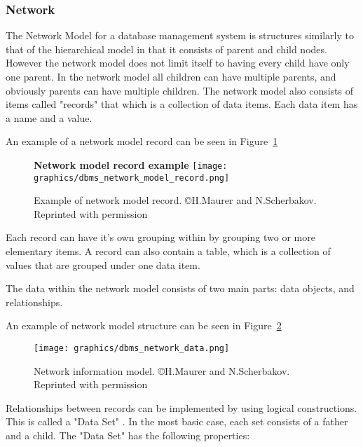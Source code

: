\documentclass[letterpaper, 12pt]{article}
\begin{document}
\subsubsection{Network}
The Network Model for a database management system is structures similarly to that of the
hierarchical model in that it consists of parent and child nodes. However the network
model does not limit itself to having every child have only one parent. In the network
model all children can have multiple parents, and obviously parents can have multiple
children. The network model also consists of items called "records" that which is a
collection of data items. Each data item has a name and a value.
\par\vspace{\baselineskip}
An example of a network model record can be seen in Figure~\ref{fig:networkDBMS_record}
\begin{figure}
  \centering
  \label{fig:networkDBMS_record}
  \textbf{Network model record example}
  \texttt{[image: graphics/dbms\_network\_model\_record.png]}
  \caption{Example of network model record. \copyright H.Maurer and N.Scherbakov. Reprinted with permission  \cite{network_model_coronet}}
\end{figure}

Each record can have it's own grouping within by grouping two or more elementary items.
A record can also contain a table, which is a collection of values that are grouped
under one data item.
\par\vspace{\baselineskip}
The data within the network model consists of two main parts: data objects, and
relationships.
\par\vspace{\baselineskip}
An example of network model structure can be seen in Figure~\ref{fig:networkDBMS_structure}
\begin{figure}
  \centering
  \label{fig:networkDBMS_structure}
  \texttt{[image: graphics/dbms\_network\_data.png]}
  \caption{Network information model. \copyright H.Maurer and N.Scherbakov. Reprinted with permission \cite{network_model_coronet}}
\end{figure}

Relationships between records can be implemented by using logical constructions.
This is called a "Data Set" . In the most basic case, each set consists of a father
and a child. The "Data Set" has the following properties:
\end{document}
